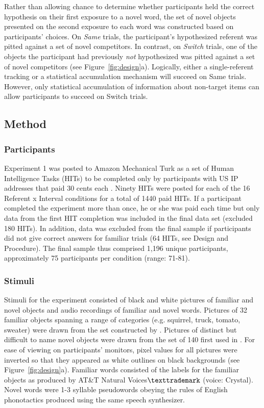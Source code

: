 \documentclass{pnastwo}
\begin{document}
\begin{article}
Rather than allowing chance to determine whether participants held the correct hypothesis on their first exposure to a novel word, the set of novel objects presented on the second exposure to each word was constructed based on participants' choices. On \emph{Same} trials, the participant's hypothesized referent was pitted against a set of novel competitors. In contrast, on \emph{Switch} trials, one of the objects the participant had previously \emph{not} hypothesized was pitted against a set of novel competitors (see Figure~\ref{fig:design}a). Logically, either a single-referent tracking or a statistical accumulation mechanism will succeed on Same trials. However, only statistical accumulation of information about non-target items can allow participants to succeed on Switch trials.

\subsection{Method}

\subsubsection{Participants}

Experiment 1 was posted to Amazon Mechanical Turk as a set of Human Intelligence Tasks (HITs) to be completed only by participants with US IP addresses that paid 30 cents each \cite<for a detailed comparison of laboratory and Mechanical Turk studies see>{Crump2013}. Ninety HITs were posted for each of the 16 Referent x Interval conditions for a total of 1440 paid HITs. If a participant completed the experiment more than once, he or she was paid each time but only data from the first HIT completion was included in the final data set (excluded 180 HITs). In addition, data was excluded from the final sample if participants did not give correct answers for familiar trials (64 HITs, see Design and Procedure). The final sample thus comprised 1,196 unique participants, approximately 75 participants per condition (range: 71-81).

\subsubsection{Stimuli}

Stimuli for the experiment consisted of black and white pictures of familiar and novel objects and audio recordings of familiar and novel words. Pictures of 32 familiar objects spanning a range of categories (e.g. squirrel, truck, tomato, sweater) were drawn from the set constructed by . Pictures of distinct but difficult to name novel objects were drawn from the set of 140 first used in . For ease of viewing on participants' monitors, pixel values for all pictures were inverted so that they appeared as white outlines on black backgrounds (see Figure~\ref{fig:design}a). Familiar words consisted of the labels for the familiar objects as produced by AT\&T Natural Voices$\texttrademark$ (voice: Crystal). Novel words were 1-3 syllable pseudowords obeying the rules of English phonotactics produced using the same speech synthesizer. 

\end{article}
\end{document}
